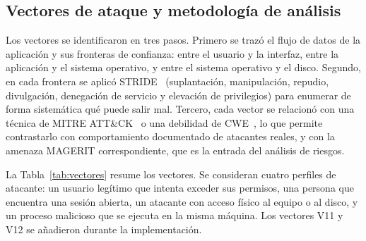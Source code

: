 \documentclass[conference]{IEEEtran}
\begin{document}
\subsection{Vectores de ataque y metodología de análisis}
\label{sec:vectores}
Los vectores se identificaron en tres pasos. Primero se trazó el flujo de datos de la aplicación y sus fronteras de confianza: entre el usuario y la interfaz, entre la aplicación y el sistema operativo, y entre el sistema operativo y el disco. Segundo, en cada frontera se aplicó STRIDE~\cite{stride} (suplantación, manipulación, repudio, divulgación, denegación de servicio y elevación de privilegios) para enumerar de forma sistemática qué puede salir mal. Tercero, cada vector se relacionó con una técnica de MITRE ATT\&CK~\cite{attack} o una debilidad de CWE~\cite{cwe}, lo que permite contrastarlo con comportamiento documentado de atacantes reales, y con la amenaza MAGERIT correspondiente, que es la entrada del análisis de riesgos.

La Tabla~\ref{tab:vectores} resume los vectores. Se consideran cuatro perfiles de atacante: un usuario legítimo que intenta exceder sus permisos, una persona que encuentra una sesión abierta, un atacante con acceso físico al equipo o al disco, y un proceso malicioso que se ejecuta en la misma máquina. Los vectores V11 y V12 se añadieron durante la implementación.
\end{document}
